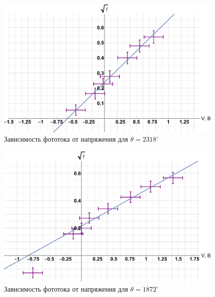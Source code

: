 \documentclass[12pt]{kiarticle} %
\begin{document}
\begin{figure}[h!]
	\includegraphics[scale=0.5]{2318.pdf}
	\caption{Зависимость фототока от напряжения для $ \theta = 2318^\circ $}
	\label{graf 2318}
\end{figure} 
	
	\begin{figure}[h!]
		\includegraphics[scale=0.5]{1872.pdf}
		\caption{Зависимость фототока от напряжения для $ \theta = 1872^\circ $}
		\label{graf 1872}
	\end{figure} 
\end{document}
